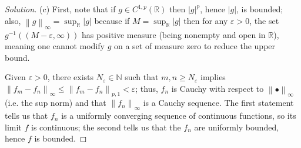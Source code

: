 \documentclass[10pt]{article}
\providecommand{\eps}{\varepsilon}
\providecommand{\NN}{\mathbb N}
\providecommand{\RR}{\mathbb R}
\providecommand{\inv}{^{-1}}
\newenvironment{soln}{\begin{proof}[Solution]}{\end{proof}}
\providecommand{\abs}[1]{\left\lvert #1\right\rvert}
\providecommand{\norm}[1]{\left\| #1\right\|}
\begin{document}
\begin{soln}
    (c) First, note that if $g\in C^{1,p}(\RR)$ then
    $\abs g^p$, hence $\abs g$, is bounded;
    also, $\norm{g}_\infty = \sup_\RR\abs g$ because
    if $M = \sup_\RR\abs g$ then
    for any $\eps > 0$, the set $g\inv((M-\eps,\infty))$
    has positive measure (being nonempty and open in $\RR$),
    meaning one cannot modify $g$ on a set of measure zero
    to reduce the upper bound.

    Given $\eps>0$, there exists $N_\eps\in\NN$ such that
    $m,n\ge N_\eps$ implies $\norm{f_m-f_n}_\infty
    \le\norm{f_m-f_n}_{p,1} <\eps$; thus, $f_n$ is Cauchy with respect
    to $\norm{\bullet}_\infty$ (i.e. the sup norm)
    and that $\norm{f_n}_\infty$ is a Cauchy sequence.
    The first statement tells us that $f_n$ is a uniformly converging sequence
    of continuous functions, so its limit $f$ is continuous;
    the second tells us that the $f_n$ are uniformly bounded, hence $f$ is bounded.
\end{soln}
\end{document}

